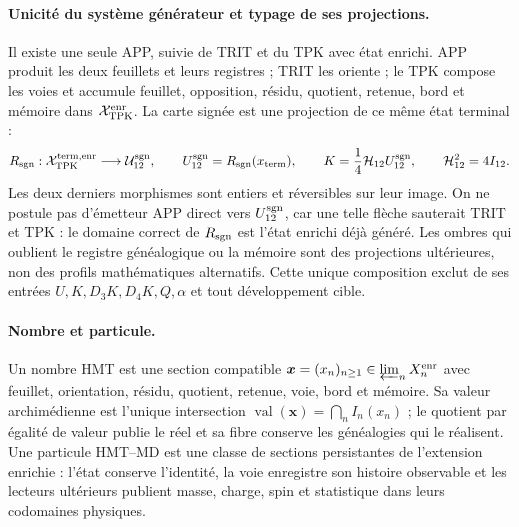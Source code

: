 \paragraph{Unicité du système générateur et typage de ses projections.}
Il existe une seule APP, suivie de TRIT et du TPK avec état enrichi.
APP produit les deux feuillets et leurs registres ; TRIT les oriente ; le TPK compose
les voies et accumule feuillet, opposition, résidu, quotient, retenue, bord et
mémoire dans \(\mathcal X_{\rm TPK}^{\rm enr}\). La carte signée est une
projection de ce même état terminal :
\[
 R_{\rm sgn}:\mathcal X_{\rm TPK}^{\rm term,enr}
 \longrightarrow\mathcal U_{12}^{\rm sgn},\qquad
 U_{12}^{\rm sgn}=R_{\rm sgn}(x_{\rm term}),\qquad
 K=\frac14\mathcal H_{12}U_{12}^{\rm sgn},\qquad
 \mathcal H_{12}^2=4I_{12}.
\]
Les deux derniers morphismes sont entiers et réversibles sur leur image. On ne
postule pas d'émetteur APP direct vers \(U_{12}^{\rm sgn}\), car une telle flèche
sauterait TRIT et TPK : le domaine correct de \(R_{\rm sgn}\) est l'état
enrichi déjà généré. Les ombres qui oublient le registre généalogique ou la mémoire sont
des projections ultérieures, non des profils mathématiques alternatifs. Cette unique
composition exclut de ses entrées
\(U,K,D_3K,D_4K,Q,\alpha\) et tout développement cible.

\paragraph{Nombre et particule.}
Un nombre HMT est une section compatible
\(
 \boldsymbol x=(x_n)_{n\geq1}\in
 \varprojlim_n X_n^{\mathrm{enr}}
\)
avec feuillet, orientation, résidu, quotient, retenue, voie, bord et mémoire.
Sa valeur archimédienne est l'unique intersection
\(
 \operatorname{val}(\boldsymbol x)=\bigcap_n I_n(x_n)
\) ;
le quotient par égalité de valeur publie le réel et sa fibre conserve les
généalogies qui le réalisent. Une particule HMT--MD est une classe de sections
persistantes de l'extension enrichie : l'état conserve l'identité,
la voie enregistre son histoire observable et les lecteurs ultérieurs publient
masse, charge, spin et statistique dans leurs codomaines physiques.

